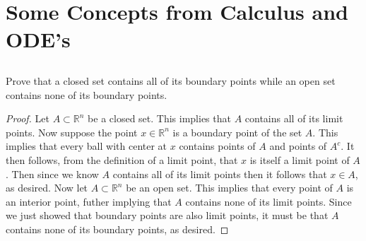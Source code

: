 \documentclass[11pt]{article}
\begin{document}
\pagestyle{fancy}
\fancyhead{}
\tableofcontents
\newpage
\section{Some Concepts from Calculus and ODE's}
\subsection{}
Prove that a closed set contains all of its boundary points while an open set contains none of its boundary points.
\begin{proof}
Let $A \subset \mathbb{R}^n$ be a closed set. This implies that $A$ contains all
of its limit points. Now suppose the point $x \in \mathbb{R}^n$ is a boundary
point of the set $A$. This implies that every ball with center at $x$ contains
points
of $A$ and points of $A^c$. It then follows, from the definition of a limit point,
that $x$ is itself a limit point of $A$. Then since we know $A$ contains all
of its limit points then it follows that $x \in A$, as desired. \newline
\indent Now let $A \subset \mathbb{R}^n$ be an open set. This implies that every
point of $A$ is an interior point, futher implying that $A$ contains none of its
limit points. Since we just showed that boundary points are also limit points,
it must be that $A$ contains none of its boundary points, as desired.
\end{proof}
\end{document}
